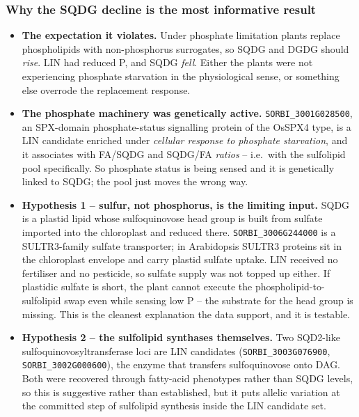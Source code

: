 \documentclass[11pt]{article}
\newcommand{\lead}[1]{\textbf{#1}}
\begin{document}
\subsubsection*{Why the SQDG decline is the most informative result}
\begin{itemize}
  \item \lead{The expectation it violates.} Under phosphate limitation plants
        replace phospholipids with non-phosphorus surrogates, so SQDG and DGDG
        should \emph{rise}. LIN had reduced P, and SQDG \emph{fell}. Either the
        plants were not experiencing phosphate starvation in the physiological
        sense, or something else overrode the replacement response.
  \item \lead{The phosphate machinery was genetically active.}
        \texttt{SORBI\_3001G028500}, an SPX-domain phosphate-status signalling
        protein of the OsSPX4 type, is a LIN candidate enriched under
        \textit{cellular response to phosphate starvation}, and it associates with
        FA/SQDG and SQDG/FA \emph{ratios} -- i.e.\ with the sulfolipid pool
        specifically. So phosphate status is being sensed and it is genetically
        linked to SQDG; the pool just moves the wrong way.
  \item \lead{Hypothesis 1 -- sulfur, not phosphorus, is the limiting input.}
        SQDG is a plastid lipid whose sulfoquinovose head group is built from
        sulfate imported into the chloroplast and reduced there.
        \texttt{SORBI\_3006G244000} is a SULTR3-family sulfate transporter; in
        Arabidopsis SULTR3 proteins sit in the chloroplast envelope and carry
        plastid sulfate uptake. LIN received no fertiliser and no pesticide, so
        sulfate supply was not topped up either. If plastidic sulfate is short,
        the plant cannot execute the phospholipid-to-sulfolipid swap even while
        sensing low P -- the substrate for the head group is missing. This is the
        cleanest explanation the data support, and it is testable.
  \item \lead{Hypothesis 2 -- the sulfolipid synthases themselves.} Two SQD2-like
        sulfoquinovosyltransferase loci are LIN candidates
        (\texttt{SORBI\_3003G076900}, \texttt{SORBI\_3002G000600}), the enzyme
        that transfers sulfoquinovose onto DAG. Both were recovered through
        fatty-acid phenotypes rather than SQDG levels, so this is suggestive
        rather than established, but it puts allelic variation at the committed
        step of sulfolipid synthesis inside the LIN candidate set.

\end{itemize}
\end{document}
